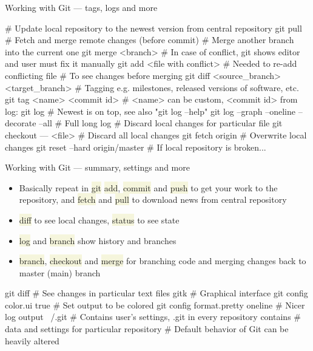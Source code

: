 \documentclass[compress, ucs, xelatex, 11pt, xcolor=svgnames, aspectratio=169,
	hyperref={
		bookmarks=true,
		unicode=true,
		colorlinks=true,
		pdftitle={Linux, command line and MetaCentrum},
		plainpages=false,
		pdfauthor={Vojtech Zeisek},
		pdfsubject={Course about use of Linux command line, writing shell scripts and using MetaCentrum of CESNET},
		pdfcreator={XeLaTeX},
		pdfkeywords={Linux, GNU, BASH, shell, command line, MetaCentrum},
		linkcolor=DarkRed, %
		anchorcolor=DarkBlue, %
		citecolor=Indigo, %
		filecolor=NavyBlue, %
		menucolor=DarkMagenta, %
		urlcolor=DarkBlue, %
		pdftex},
	url={hyphens, lowtilde} %
	]{beamer}
\renewcommand{\texttt}[1]{\colorbox{Beige}{{\ttfamily #1}}}
\begin{document}
\begin{frame}[fragile]{Working with Git --- tags, logs and more}
	\begin{bashcode}
    # Update local repository to the newest version from central repository
    git pull # Fetch and merge remote changes (before commit)
    # Merge another branch into the current one
    git merge <branch>
    # In case of conflict, git shows editor and user must fix it manually
    git add <file with conflict> # Needed to re-add conflicting file
    # To see changes before merging
    git diff <source_branch> <target_branch>
    # Tagging e.g. milestones, released versions of software, etc.
    git tag <name> <commit id> # <name> can be custom, <commit id> from log:
    git log # Newest is on top, see also "git log --help"
    git log --graph --oneline --decorate --all # Full long log
    # Discard local changes for particular file
    git checkout --- <file>
    # Discard all local changes
    git fetch origin # Overwrite local changes
    git reset --hard origin/master # If local repository is broken...
	\end{bashcode}
\end{frame}

\begin{frame}[fragile]{Working with Git --- summary, settings and more}
	\begin{itemize}
		\item Basically repeat in \texttt{git} \texttt{add}, \texttt{commit} and \texttt{push} to get your work to the repository, and \texttt{fetch} and \texttt{pull} to download news from central repository
		\item \texttt{diff} to see local changes, \texttt{status} to see state
		\item \texttt{log} and \texttt{branch} show history and branches
		\item \texttt{branch}, \texttt{checkout} and \texttt{merge} for branching code and merging changes back to master (main) branch
	\end{itemize}
	\begin{bashcode}
    git diff # See changes in particular text files
    gitk # Graphical interface
    git config color.ui true # Set output to be colored
    git config format.pretty oneline # Nicer log output
    ~/.git # Contains user's settings, .git in every repository contains
           # data and settings for particular repository
           # Default behavior of Git can be heavily altered
	\end{bashcode}
\end{frame}
\end{document}
